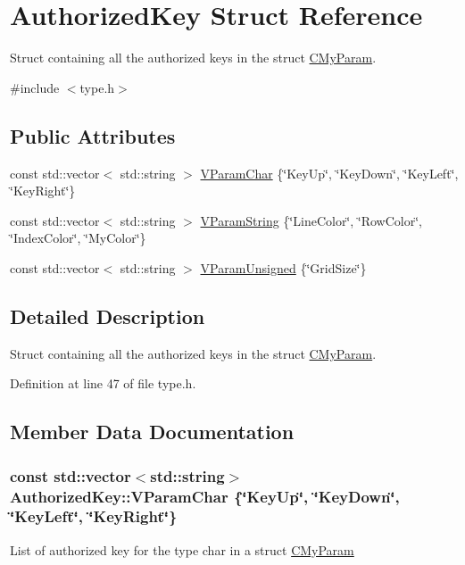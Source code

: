 \hypertarget{struct_authorized_key}{\section{Authorized\+Key Struct Reference}
\label{struct_authorized_key}
}


Struct containing all the authorized keys in the struct \hyperlink{struct_c_my_param}{C\+My\+Param}.  




{\ttfamily \#include $<$type.\+h$>$}

\subsection*{Public Attributes}
\begin{DoxyCompactItemize}
\item 
const std\+::vector$<$ std\+::string $>$ \hyperlink{struct_authorized_key_a1b1aa7863427cc1b43f229423bdd83ba}{V\+Param\+Char} \{\char`\"{}Key\+Up\char`\"{}, \char`\"{}Key\+Down\char`\"{}, \char`\"{}Key\+Left\char`\"{}, \char`\"{}Key\+Right\char`\"{}\}
\item 
const std\+::vector$<$ std\+::string $>$ \hyperlink{struct_authorized_key_a14d2cbd0e3dcc77a793a55f988d78b73}{V\+Param\+String} \{\char`\"{}Line\+Color\char`\"{}, \char`\"{}Row\+Color\char`\"{}, \char`\"{}Index\+Color\char`\"{}, \char`\"{}My\+Color\char`\"{}\}
\item 
const std\+::vector$<$ std\+::string $>$ \hyperlink{struct_authorized_key_a871173f4b0c89c91289a10f0ddc1cadd}{V\+Param\+Unsigned} \{\char`\"{}Grid\+Size\char`\"{}\}
\end{DoxyCompactItemize}


\subsection{Detailed Description}
Struct containing all the authorized keys in the struct \hyperlink{struct_c_my_param}{C\+My\+Param}. 

Definition at line 47 of file type.\+h.



\subsection{Member Data Documentation}
\hypertarget{struct_authorized_key_a1b1aa7863427cc1b43f229423bdd83ba}{
\subsubsection[{V\+Param\+Char}]{\setlength{\rightskip}{0pt plus 5cm}const std\+::vector$<$std\+::string$>$ Authorized\+Key\+::\+V\+Param\+Char \{\char`\"{}Key\+Up\char`\"{}, \char`\"{}Key\+Down\char`\"{}, \char`\"{}Key\+Left\char`\"{}, \char`\"{}Key\+Right\char`\"{}\}}}\label{struct_authorized_key_a1b1aa7863427cc1b43f229423bdd83ba}
List of authorized key for the type char in a struct \hyperlink{struct_c_my_param}{C\+My\+Param} 

